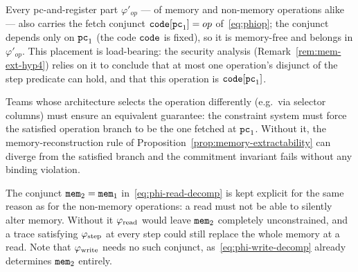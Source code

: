 Every pc-and-register part $\varphi'_{op}$ --- of memory and non-memory
operations alike --- also carries the fetch conjunct $\mathtt{code}[\mathtt{pc}_1]=op$
of~\eqref{eq:phiop}; the conjunct depends only on $\mathtt{pc}_1$ (the code $\mathtt{code}$ is
fixed), so it is memory-free and belongs in $\varphi'_{op}$.  This placement is
load-bearing: the security analysis (Remark~\ref{rem:mem-ext-hyp4}) relies on
it to conclude that at most one operation's disjunct of the step predicate can
hold, and that this operation is $\mathtt{code}[\mathtt{pc}_1]$.
\begin{instruction}
Teams whose architecture selects the operation differently (e.g.\ via selector
columns) must ensure an equivalent guarantee: the constraint system must force
the satisfied operation branch to be the one fetched at $\mathtt{pc}_1$.  Without it,
the memory-reconstruction rule of
Proposition~\ref{prop:memory-extractability} can diverge from the satisfied
branch and the commitment invariant fails without any binding violation.
\end{instruction}

The conjunct $\mathtt{mem}_2=\mathtt{mem}_1$ in~\eqref{eq:phi-read-decomp} is kept explicit for
the same reason as for the non-memory operations: a read must not be able to
silently alter memory.  Without it $\varphi_{\mathrm{read}}$ would leave $\mathtt{mem}_2$ completely
unconstrained, and a trace satisfying $\varphi_{\mathrm{step}}$ at every step could
still replace the whole memory at a read.  Note that $\varphi_{\mathrm{write}}$ needs no
such conjunct, as~\eqref{eq:phi-write-decomp} already determines $\mathtt{mem}_2$
entirely.


